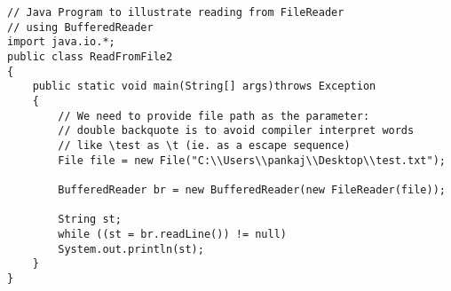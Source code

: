\begin{lstlisting}[tabsize=4,caption={File reading java code example from GeeksforGeeks},label={lst:code-example}]
// Java Program to illustrate reading from FileReader 
// using BufferedReader 
import java.io.*; 
public class ReadFromFile2 
{ 
	public static void main(String[] args)throws Exception 
	{ 
		// We need to provide file path as the parameter: 
		// double backquote is to avoid compiler interpret words 
		// like \test as \t (ie. as a escape sequence) 
		File file = new File("C:\\Users\\pankaj\\Desktop\\test.txt"); 
		
		BufferedReader br = new BufferedReader(new FileReader(file)); 
		
		String st; 
		while ((st = br.readLine()) != null) 
		System.out.println(st); 
	} 
} 
\end{lstlisting}

